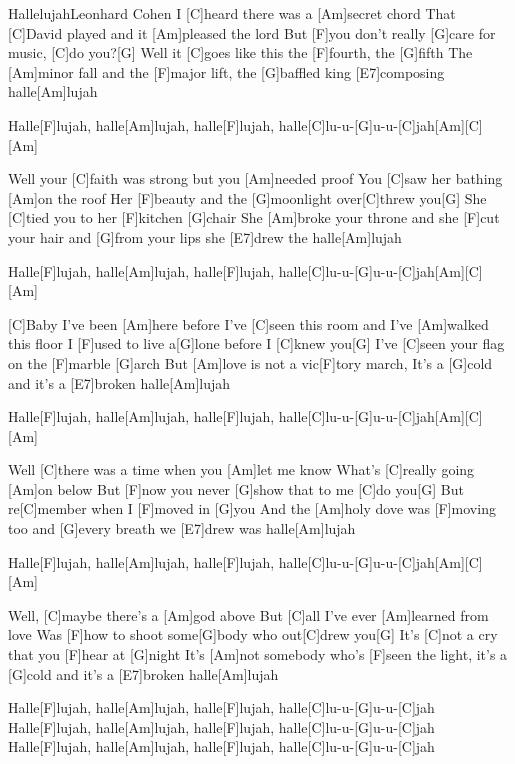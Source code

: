 \documentclass[../main.tex]{subfiles}
\begin{document}
\begin{song}[1]{Hallelujah}{Leonhard Cohen}{}
I [C]heard there was a [Am]secret chord
That [C]David played and it [Am]pleased the lord
But [F]you don't really [G]care for music, [C]do you?[G]{\hh}
Well it [C]goes like this the [F]fourth, the [G]fifth
The [Am]minor fall and the [F]major lift, the [G]baffled king [E7]composing halle[Am]lujah

Halle[F]lujah, halle[Am]lujah, halle[F]lujah, halle[C]lu-u-[G]u-u-[C]jah[Am]{\hh}[C]{\hh}[Am]{\hh}

Well your [C]faith was strong but you [Am]needed proof
You [C]saw her bathing [Am]on the roof
Her [F]beauty and the [G]moonlight over[C]threw you[G]{\hh}
She [C]tied you to her [F]kitchen [G]chair
She [Am]broke your throne and she [F]cut your hair and [G]from your lips she [E7]drew the halle[Am]lujah

Halle[F]lujah, halle[Am]lujah, halle[F]lujah, halle[C]lu-u-[G]u-u-[C]jah[Am]{\hh}[C]{\hh}[Am]{\hh}

[C]Baby I've been [Am]here before
I've [C]seen this room and I've [Am]walked this floor
I [F]used to live a[G]lone before I [C]knew you[G]{\hh}
I've [C]seen your flag on the [F]marble [G]arch
But [Am]love is not a vic[F]tory march, It's a [G]cold and it's a [E7]broken halle[Am]lujah

Halle[F]lujah, halle[Am]lujah, halle[F]lujah, halle[C]lu-u-[G]u-u-[C]jah[Am]{\hh}[C]{\hh}[Am]{\hh}

Well [C]there was a time when you [Am]let me know
What's [C]really going [Am]on below
But [F]now you never [G]show that to me [C]do you[G]{\hh}
But re[C]member when I [F]moved in [G]you
And the [Am]holy dove was [F]moving too and [G]every breath we [E7]drew was halle[Am]lujah

Halle[F]lujah, halle[Am]lujah, halle[F]lujah, halle[C]lu-u-[G]u-u-[C]jah[Am]{\hh}[C]{\hh}[Am]{\hh}

Well, [C]maybe there's a [Am]god above
But [C]all I've ever [Am]learned from love
Was [F]how to shoot some[G]body who out[C]drew you[G]{\hh}
It's [C]not a cry that you [F]hear at [G]night
It's [Am]not somebody who's [F]seen the light, it's a [G]cold and it's a [E7]broken halle[Am]lujah

Halle[F]lujah, halle[Am]lujah, halle[F]lujah, halle[C]lu-u-[G]u-u-[C]jah
Halle[F]lujah, halle[Am]lujah, halle[F]lujah, halle[C]lu-u-[G]u-u-[C]jah
Halle[F]lujah, halle[Am]lujah, halle[F]lujah, halle[C]lu-u-[G]u-u-[C]jah

\end{song}
\end{document}
